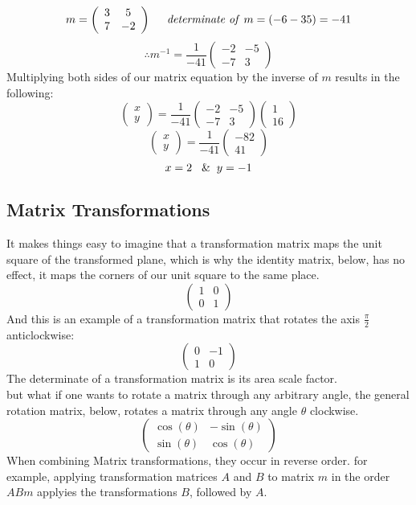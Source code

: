 \documentclass{article}
\begin{document}
\[m=\left(\begin{array}{cc} 3 & 5 \\ 7 & -2 \end{array}\right) \hspace{0.5cm} \text{\textit{determinate of} } m=\left(-6-35\right)=-41\]
\[ \therefore m^{-1} = \frac{1}{-41} \left(\begin{array}{cc} -2 & -5 \\ -7 & 3 \end{array}\right)\]
Multiplying both sides of our matrix equation by the inverse of \(m\) results in the following:
\[\left(\begin{array}{c} x \\ y \end{array}\right) = \frac{1}{-41} \left(\begin{array}{cc} -2 & -5 \\ -7 & 3 \end{array}\right) \left(\begin{array}{c} 1 \\ 16 \end{array}\right)\]
\[\left(\begin{array}{c} x \\ y \end{array}\right) = \frac{1}{-41} \left(\begin{array}{c} -82 \\ 41 \end{array}\right)\]
\[x=2 \hspace{0.3cm} \& \hspace{0.2cm} y=-1\]
\subsection{Matrix Transformations}
It makes things easy to imagine that a transformation matrix maps the unit square of the transformed plane, which is why the identity matrix, below,  has no effect, it maps the corners of our unit square to the same place.
\[\left(\begin{array}{cc} 1 & 0 \\ 0 & 1 \end{array}\right)\]
And this is an example of a transformation matrix that rotates the axis \(\frac{\pi}{2}\) anticlockwise:
\[\left(\begin{array}{cc} 0 & -1 \\ 1 & 0 \end{array}\right)\]
The determinate of a transformation matrix is its area scale factor. \\ but what if one wants to rotate a matrix through any arbitrary angle, the general rotation matrix, below, rotates a matrix through any angle \(\theta\) clockwise.
\[\left(\begin{array}{cc} \cos\left(\theta\right) & -\sin\left(\theta\right) \\ \sin\left(\theta\right) & \cos\left(\theta\right) \end{array}\right)\]
When combining Matrix transformations, they occur in reverse order. for example, applying transformation matrices \(A\) and \(B\) to matrix \(m\) in the order \(ABm\) applyies the transformations \(B\), followed by \(A\).
\end{document}
